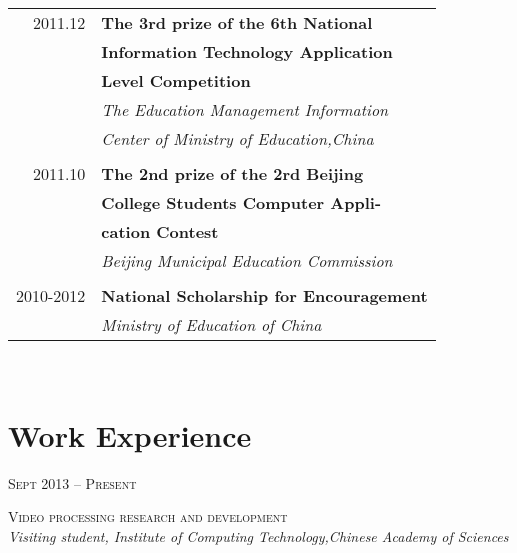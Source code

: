 \documentclass[10pt,a4paper]{article} %
\begin{document}
\begin{minipage}[t]{0.44\textwidth}
\begin{tabular}{rl}
2011.12     & \small\textbf{The 3rd prize of the 6th National} \\
& \small\textbf{ Information Technology Application }\\
& \small\textbf{ Level Competition}\\
& \small\textit{The Education Management Information}\\
& \small\textit{ Center of Ministry of Education,China}\\ \\

2011.10     & \small\textbf{The 2nd prize of the 2rd Beijing}\\
& \small\textbf{ College Students Computer Appli-}\\
& \small\textbf{ cation Contest}\\
& \small\textit{Beijing Municipal Education Commission}\\ \\

2010-2012    & \small\textbf{National Scholarship for Encouragement}\\
& \small\textit{Ministry of Education of China}

\end{tabular}\\[0pt]


\section{Work Experience}
{\raggedleft\textsc{Sept 2013 -- Present}\par}

{\raggedright \small\textsc{Video processing research and development }\\

\textit{Visiting student, Institute of Computing Technology,Chinese Academy of Sciences}\\}


\end{minipage}
\end{document}
